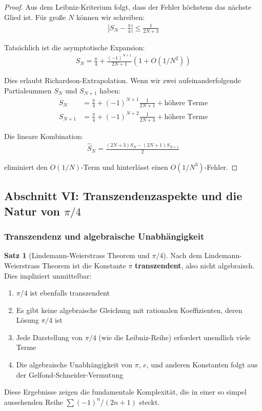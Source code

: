 \documentclass[a4paper,12pt,twoside]{report}
\theoremstyle{definition}
\newtheorem{satz}{Satz}
\begin{document}
\begin{proof}
Aus dem Leibniz-Kriterium folgt, dass der Fehler höchstens das nächste Glied ist. Für große $N$ können wir schreiben:
\begin{align}
	\left| S_N - \frac{\pi}{4} \right| \leq \frac{1}{2N+3}
\end{align}

Tatsächlich ist die asymptotische Expansion:
\begin{align}
	S_N = \frac{\pi}{4} + \frac{(-1)^{N+1}}{2N+1} \left( 1 + O(1/N^2) \right)
\end{align}

Dies erlaubt Richardson-Extrapolation. Wenn wir zwei aufeinanderfolgende Partialsummen $S_N$ und $S_{N+1}$ haben:
\begin{align}
	S_N &= \frac{\pi}{4} + (-1)^{N+1} \frac{1}{2N+1} + \text{höhere Terme} \\
	S_{N+1} &= \frac{\pi}{4} + (-1)^{N+2} \frac{1}{2N+3} + \text{höhere Terme}
\end{align}

Die lineare Kombination:
\begin{align}
	\hat{S}_N = \frac{(2N+3) S_N - (2N+1) S_{N+1}}{2}
\end{align}

eliminiert den $O(1/N)$-Term und hinterlässt einen $O(1/N^3)$-Fehler.
\end{proof}

\subsection{Abschnitt VI: Transzendenzaspekte und die Natur von $\pi/4$}

\subsubsection{Transzendenz und algebraische Unabhängigkeit}

\begin{satz}[Lindemann-Weierstrass Theorem und $\pi/4$]
Nach dem Lindemann-Weierstrass Theorem ist die Konstante $\pi$ \textbf{transzendent}, also nicht algebraisch. Dies impliziert unmittelbar:

\begin{enumerate}
	\item $\pi/4$ ist ebenfalls transzendent
	
	\item Es gibt keine algebraische Gleichung mit rationalen Koeffizienten, deren Lösung $\pi/4$ ist
	
	\item Jede Darstellung von $\pi/4$ (wie die Leibniz-Reihe) erfordert unendlich viele Terme
	
	\item Die algebraische Unabhängigkeit von $\pi$, $e$, und anderen Konstanten folgt aus der Gelfond-Schneider-Vermutung
\end{enumerate}

Diese Ergebnisse zeigen die fundamentale Komplexität, die in einer so simpel aussehenden Reihe $\sum (-1)^n/(2n+1)$ steckt.
\end{satz}
\end{document}
